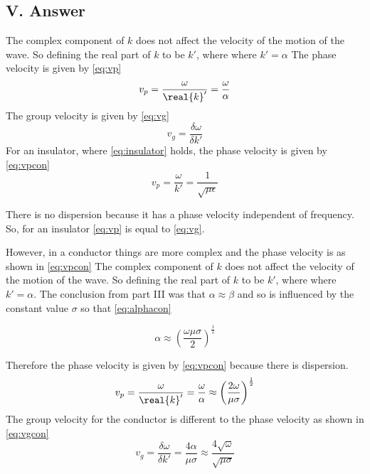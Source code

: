 \documentclass[12pt]{article}
\begin{document}
\subsection*{V. Answer}
\noindent
The complex component of $k$ does not affect the velocity of the motion of the wave. So defining the real part of $k$ to be $k'$, where where $k'=\alpha$ The phase velocity is given by \cref{eq:vp}
\begin{equation}
\label{eq:vp}
v_{p} =\frac{\omega}{\real{k}'}=\frac{\omega}{\alpha}
\end{equation}
The group velocity is given by \cref{eq:vg}
\begin{equation}
\label{eq:vg}
v_{g} =\frac{\delta\omega}{\delta k'}
\end{equation}
\noindent
For an insulator, where \cref{eq:insulator} holds, the phase velocity is given by \cref{eq:vpcon} 
\begin{equation}
\label{eq:vins}
v_{p} =\frac{\omega}{k'}=\frac{1}{\sqrt{\mu\epsilon}}
\end{equation}

There is no dispersion because it has a phase velocity independent of frequency. So, for an insulator \cref{eq:vp} is equal to  \cref{eq:vg}.

\noindent
However, in a conductor things are more complex and the phase velocity is as shown in \cref{eq:vpcon}
\noindent
The complex component of $k$ does not affect the velocity of the motion of the wave. So defining the real part of $k$ to be $k'$, where where $k'=\alpha$. The conclusion from part III was that $\alpha\approx \beta$ and so is influenced by the constant value $\sigma$ so that \cref{eq:alphacon} 

\begin{equation}
\label{eq:alphacon}
\alpha \approx \left(\frac{\omega\mu\sigma}{2}\right)^{\frac{1}{2}}
\end{equation}

Therefore the phase velocity is given by \cref{eq:vpcon} because there is dispersion.
\begin{equation}
\label{eq:vpcon}
v_{p}=\frac{\omega}{\real{k}'}=\frac{\omega}{\alpha} \approx \left( \frac{2\omega}{\mu\sigma}\right)^{\frac{1}{2}}
\end{equation}
\noindent
The group velocity for the conductor is different to the phase velocity as shown in \cref{eq:vgcon}
\begin{equation}
\label{eq:vgcon}
v_{g} =\frac{\delta\omega}{\delta k'}= \frac{4\alpha}{\mu\sigma}\approx\frac{4\sqrt{\omega}}{\sqrt{\mu\sigma}}
\end{equation}
\end{document}
